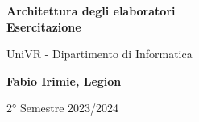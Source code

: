 \begin{titlepage}
	\begin{center}
		\vspace*{1cm}

		\Huge
		\textbf{Architettura degli elaboratori\\Esercitazione}

		\vspace{0.5cm}
		\LARGE
		UniVR - Dipartimento di Informatica

		\vspace{1.5cm}

		\textbf{Fabio Irimie, Legion}

		\vfill


		\vspace{0.8cm}


		2° Semestre 2023/2024

	\end{center}
\end{titlepage}
